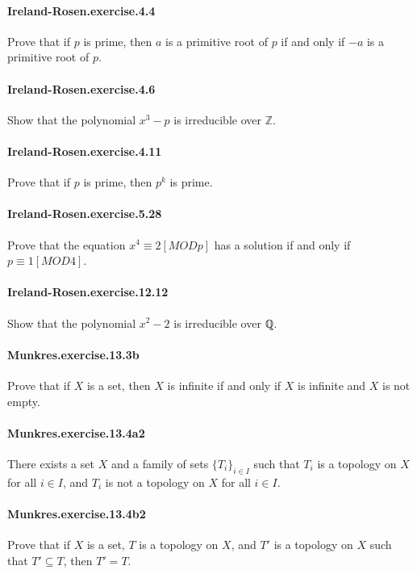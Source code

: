 \documentclass{article}
\begin{document}
{\paragraph{Ireland-Rosen.exercise.4.4} Prove that if $p$ is prime, then $a$ is a primitive root of $p$ if and only if $-a$ is a primitive root of $p$.

\paragraph{Ireland-Rosen.exercise.4.6} Show that the polynomial $x^3 - p$ is irreducible over $\mathbb{Z}$.

\paragraph{Ireland-Rosen.exercise.4.11} Prove that if $p$ is prime, then $p^k$ is prime.

\paragraph{Ireland-Rosen.exercise.5.28} Prove that the equation $x^4 ≡ 2 [MOD p]$ has a solution if and only if $p ≡ 1 [MOD 4]$.

\paragraph{Ireland-Rosen.exercise.12.12} Show that the polynomial $x^2 - 2$ is irreducible over ℚ.

\paragraph{Munkres.exercise.13.3b} Prove that if $X$ is a set, then $X$ is infinite if and only if $X$ is infinite and $X$ is not empty.

\paragraph{Munkres.exercise.13.4a2} There exists a set $X$ and a family of sets $\{T_i\}_{i\in I}$ such that $T_i$ is a topology on $X$ for all $i\in I$, and $T_i$ is not a topology on $X$ for all $i\in I$.

\paragraph{Munkres.exercise.13.4b2} Prove that if $X$ is a set, $T$ is a topology on $X$, and $T'$ is a topology on $X$ such that $T' ⊆ T$, then $T' = T$.

}
\end{document}
